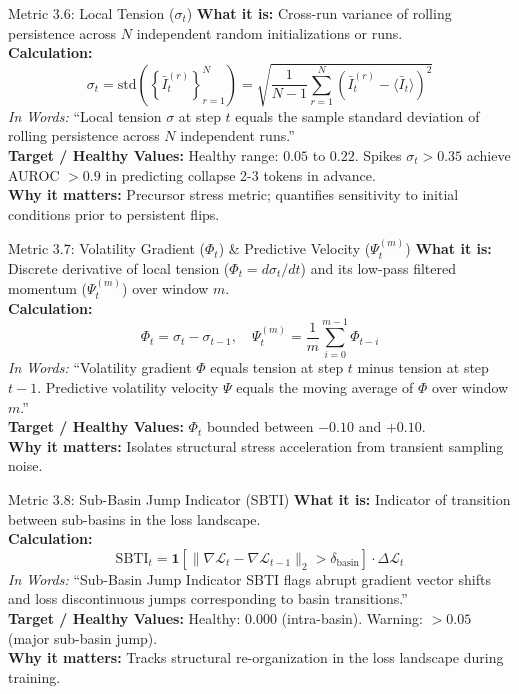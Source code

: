 \documentclass[11pt,a4paper]{article}
\begin{document}
\begin{metricbox}{Metric 3.6: Local Tension ($\sigma_t$)}
\textbf{What it is:} Cross-run variance of rolling persistence across $N$ independent random initializations or runs.\\
\textbf{Calculation:}
 $$\sigma_t = \text{std}\left(\left\{\bar{I}_t^{(r)}\right\}_{r=1}^N\right) = \sqrt{\frac{1}{N-1} \sum_{r=1}^N \left(\bar{I}_t^{(r)} - \langle \bar{I}_t \rangle\right)^2}$$ \emph{In Words:} ``Local tension $\sigma$ at step $t$ equals the sample standard deviation of rolling persistence across $N$ independent runs.''\\
\textbf{Target / Healthy Values:} Healthy range: $0.05$ to $0.22$. Spikes $\sigma_t > 0.35$ achieve AUROC $> 0.9$ in predicting collapse 2-3 tokens in advance.\\
\textbf{Why it matters:} Precursor stress metric; quantifies sensitivity to initial conditions prior to persistent flips.
\end{metricbox}

\begin{metricbox}{Metric 3.7: Volatility Gradient ($\Phi_t$) \& Predictive Velocity ($\Psi_t^{(m)}$)}
\textbf{What it is:} Discrete derivative of local tension ($\Phi_t = d\sigma_t/dt$) and its low-pass filtered momentum ($\Psi_t^{(m)}$) over window $m$.\\
\textbf{Calculation:}
 $$\Phi_t = \sigma_t - \sigma_{t-1}, \quad \Psi_t^{(m)} = \frac{1}{m} \sum_{i=0}^{m-1} \Phi_{t-i}$$ \emph{In Words:} ``Volatility gradient $\Phi$ equals tension at step $t$ minus tension at step $t-1$. Predictive volatility velocity $\Psi$ equals the moving average of $\Phi$ over window $m$.''\\
\textbf{Target / Healthy Values:} $\Phi_t$ bounded between $-0.10$ and $+0.10$.\\
\textbf{Why it matters:} Isolates structural stress acceleration from transient sampling noise.
\end{metricbox}

\begin{metricbox}{Metric 3.8: Sub-Basin Jump Indicator (SBTI)}
\textbf{What it is:} Indicator of transition between sub-basins in the loss landscape.\\
\textbf{Calculation:}
 $$\text{SBTI}_t = \mathbf{1}\left[\|\nabla \mathcal{L}_t - \nabla \mathcal{L}_{t-1}\|_2 > \delta_{\text{basin}}\right] \cdot \Delta \mathcal{L}_t$$ \emph{In Words:} ``Sub-Basin Jump Indicator SBTI flags abrupt gradient vector shifts and loss discontinuous jumps corresponding to basin transitions.''\\
\textbf{Target / Healthy Values:} Healthy: $0.000$ (intra-basin). Warning: $> 0.05$ (major sub-basin jump).\\
\textbf{Why it matters:} Tracks structural re-organization in the loss landscape during training.
\end{metricbox}
\end{document}
